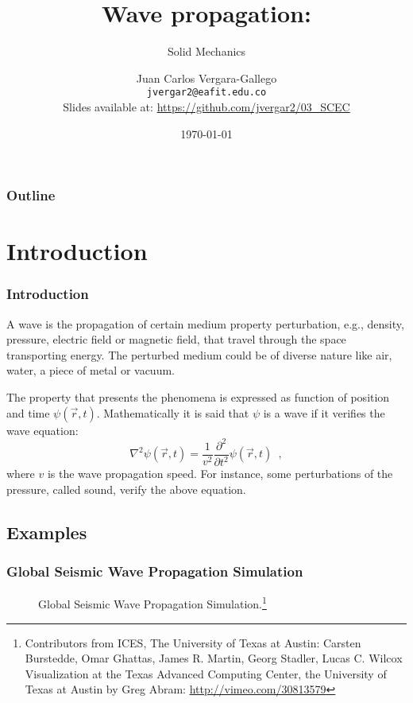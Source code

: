 \documentclass{beamer}
\begin{document}
\title[SCEC] %
{Wave propagation:}
\subtitle{Solid Mechanics}
\author[Vergara-Gallego, Juan Carlos] %
{Juan Carlos Vergara-Gallego\\ \texttt{\small jvergar2@eafit.edu.co}\\
{\tiny Slides available at: \url{https://github.com/jvergar2/03_SCEC}}}
\date{\today}
\subject{Wave propagation}

\frame{\titlepage}

\begin{frame}
	\frametitle{Outline}
	\tableofcontents
\end{frame}
%


\section{Introduction}
\begin{frame}
\frametitle{Introduction}
A wave is the propagation of certain medium property perturbation, e.g., density, pressure, electric field or magnetic field, that travel through the space transporting energy. The perturbed medium could be of diverse nature like air, water, a piece of metal or vacuum.

The property that presents the phenomena is expressed as function of position and time $\psi(\vec{r},t)$. Mathematically  it is said that $\psi$ is a wave if it verifies the wave equation:
\[\nabla^2 \psi(\vec{r},t)= \frac{1}{v^2} \frac{\partial^2 }{\partial t^2}\psi(\vec{r},t) \enspace ,\]
where $v$ is the wave propagation speed. For instance, some perturbations of the pressure, called sound, verify the above equation.
\end{frame}

\subsection{Examples}
\begin{frame}\frametitle{Global Seismic Wave Propagation Simulation}
\begin{figure}[H]
\centering
{}
\caption{Global Seismic Wave Propagation Simulation.\footnote{Contributors from ICES, The University of Texas at Austin: Carsten Burstedde, Omar Ghattas, James R. Martin, Georg Stadler, Lucas C. Wilcox Visualization at the Texas Advanced Computing Center, the University of Texas at Austin by Greg Abram: \url{http://vimeo.com/30813579}}}
\label{vid:global}
\end{figure}
\end{frame}
\end{document}
